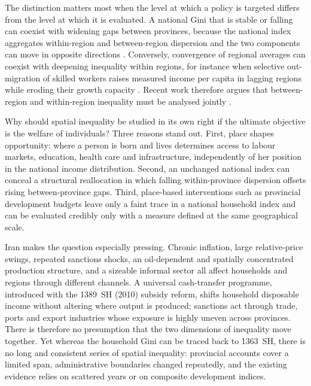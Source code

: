 \documentclass[11pt,a4paper]{article}
\begin{document}
The distinction matters most when the level at which a policy is targeted differs from the level at which it is evaluated. A national Gini that is stable or falling can coexist with widening gaps between provinces, because the national index aggregates within-region and between-region dispersion and the two components can move in opposite directions \citep{Shorrocks2005,Novotny2007}. Conversely, convergence of regional averages can coexist with deepening inequality within regions, for instance when selective out-migration of skilled workers raises measured income per capita in lagging regions while eroding their growth capacity \citep{Fratesi2014}. Recent work therefore argues that between-region and within-region inequality must be analysed jointly \citep{Rey2018,CapelloCerisola2024,LeeBreau2026}.

Why should spatial inequality be studied in its own right if the ultimate objective is the welfare of individuals? Three reasons stand out. First, place shapes opportunity: where a person is born and lives determines access to labour markets, education, health care and infrastructure, independently of her position in the national income distribution. Second, an unchanged national index can conceal a structural reallocation in which falling within-province dispersion offsets rising between-province gaps. Third, place-based interventions such as provincial development budgets leave only a faint trace in a national household index and can be evaluated credibly only with a measure defined at the same geographical scale.

Iran makes the question especially pressing. Chronic inflation, large relative-price swings, repeated sanctions shocks, an oil-dependent and spatially concentrated production structure, and a sizeable informal sector all affect households and regions through different channels. A universal cash-transfer programme, introduced with the 1389~SH (2010) subsidy reform, shifts household disposable income without altering where output is produced; sanctions act through trade, ports and export industries whose exposure is highly uneven across provinces. There is therefore no presumption that the two dimensions of inequality move together. Yet whereas the household Gini can be traced back to 1363~SH, there is no long and consistent series of spatial inequality: provincial accounts cover a limited span, administrative boundaries changed repeatedly, and the existing evidence relies on scattered years or on composite development indices.
\end{document}
